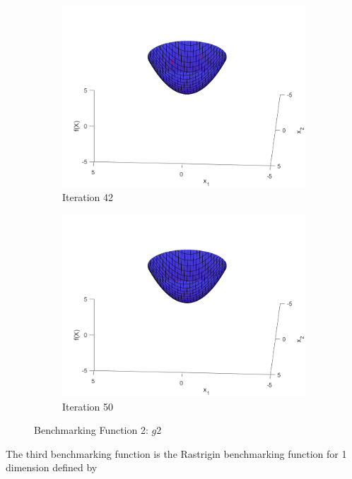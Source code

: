 \begin{figure}
\begin{subfigure}[b]{0.4\textwidth}
    \includegraphics[width=\textwidth]{img/smpl/sphr/loa-iter-42}
    \caption{Iteration 42}
    \label{fig:s2-iter-6}
  \end{subfigure}
  \begin{subfigure}[b]{0.4\textwidth}
    \includegraphics[width=\textwidth]{img/smpl/sphr/loa-iter-50}
    \caption{Iteration 50}
    \label{fig:s2-iter-7}
  \end{subfigure}
  \caption{Benchmarking Function 2: $g2$}
\end{figure}


\par The third benchmarking function is the Rastrigin benchmarking function for 1 dimension defined by

